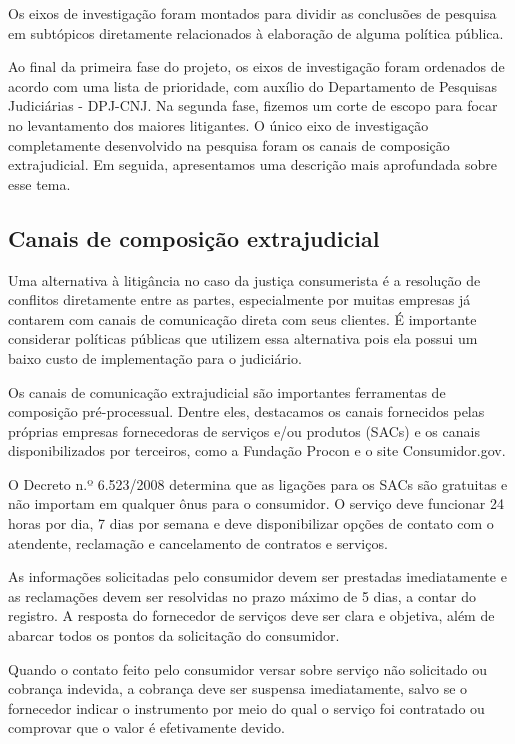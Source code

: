 \documentclass[]{report}
\begin{document}
Os eixos de investigação foram montados para dividir as conclusões de
pesquisa em subtópicos diretamente relacionados à elaboração de alguma
política pública.

Ao final da primeira fase do projeto, os eixos de investigação foram
ordenados de acordo com uma lista de prioridade, com auxílio do
Departamento de Pesquisas Judiciárias - DPJ-CNJ. Na segunda fase,
fizemos um corte de escopo para focar no levantamento dos maiores
litigantes. O único eixo de investigação completamente desenvolvido na
pesquisa foram os canais de composição extrajudicial. Em seguida,
apresentamos uma descrição mais aprofundada sobre esse tema.

\subsection{Canais de composição
extrajudicial}\label{canais-de-composicao-extrajudicial}

Uma alternativa à litigância no caso da justiça consumerista é a
resolução de conflitos diretamente entre as partes, especialmente por
muitas empresas já contarem com canais de comunicação direta com seus
clientes. É importante considerar políticas públicas que utilizem essa
alternativa pois ela possui um baixo custo de implementação para o
judiciário.

Os canais de comunicação extrajudicial são importantes ferramentas de
composição pré-processual. Dentre eles, destacamos os canais fornecidos
pelas próprias empresas fornecedoras de serviços e/ou produtos (SACs) e
os canais disponibilizados por terceiros, como a Fundação Procon e o
site Consumidor.gov.

O Decreto n.º 6.523/2008 determina que as ligações para os SACs são
gratuitas e não importam em qualquer ônus para o consumidor. O serviço
deve funcionar 24 horas por dia, 7 dias por semana e deve disponibilizar
opções de contato com o atendente, reclamação e cancelamento de
contratos e serviços.

As informações solicitadas pelo consumidor devem ser prestadas
imediatamente e as reclamações devem ser resolvidas no prazo máximo de 5
dias, a contar do registro. A resposta do fornecedor de serviços deve
ser clara e objetiva, além de abarcar todos os pontos da solicitação do
consumidor.

Quando o contato feito pelo consumidor versar sobre serviço não
solicitado ou cobrança indevida, a cobrança deve ser suspensa
imediatamente, salvo se o fornecedor indicar o instrumento por meio do
qual o serviço foi contratado ou comprovar que o valor é efetivamente
devido.
\end{document}
